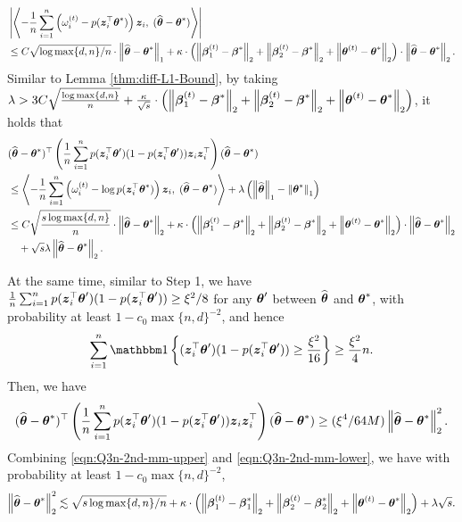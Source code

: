\begin{align*}
&  \abs{\angles{-\frac{1}{n} \sum_{i=1}^{n} \paren{\omega_i^{(t)}- p(\bz_i^\top\btheta^*)}\bz_i, \; (\hat\btheta-\btheta^*) }}  \\
& \le 
C \sqrt{\log \max\{d,n\} / n}\cdot\norm{\hat\btheta-\btheta^*}_1 
+ \kappa\cdot\paren{\norm{\bbeta_1^{(t)} - \bbeta^*}_2 + \norm{\bbeta_2^{(t)} - \bbeta^*}_2 + \norm{\btheta^{(t)} - \btheta^*}_2}\cdot\norm{\hat\btheta-\btheta^*}_2.
\end{align*}
Similar to Lemma \ref{thm:diff-L1-Bound}, by taking $\lambda > 3C\sqrt{\frac{\log \max\{d,n\}}{ n}} + \frac{\kappa}{\sqrt{s}}\cdot\paren{\norm{\bbeta_1^{(t)} - \bbeta^*}_2 + \norm{\bbeta_2^{(t)} - \bbeta^*}_2 + \norm{\btheta^{(t)} - \btheta^*}_2}$, it holds that
\begin{equation}\label{eqn:Q3n-2nd-mm-upper}
	\begin{aligned}
		& (\hat\btheta-\btheta^*)^\top \paren{\frac{1}{n} \sum_{i=1}^{n}p(\bz_i^\top\btheta')(1-p(\bz_i^\top\btheta'))\bz_i\bz_i^\top} (\hat\btheta-\btheta^*)\\
		& \le 
		\angles{-\frac{1}{n} \sum_{i=1}^{n} \paren{\omega_i^{(t)}-\log p(\bz_i^\top\btheta^*)}\bz_i, \; (\hat\btheta-\btheta^*) } + \lambda \paren{\norm{\hat\btheta}_1 - \norm{\btheta^*}_1} \\
		& \le 
		C \sqrt{\frac{s \log \max\{d,n\} }{ n}}\cdot\norm{\hat\btheta-\btheta^*}_2 
		+ \kappa\cdot\paren{\norm{\bbeta_1^{(t)} - \bbeta^*}_2 + \norm{\bbeta_2^{(t)} - \bbeta^*}_2 + \norm{\btheta^{(t)} - \btheta^*}_2}\cdot\norm{\hat\btheta-\btheta^*}_2 \\
		&\quad + \sqrt{s}\lambda \norm{\hat\btheta - \btheta^*}_2.
	\end{aligned}
\end{equation}

At the same time, similar to Step 1, we have $\frac{1}{n}\sum_{i=1}^{n}p(\bz_i^\top\btheta')(1-p(\bz_i^\top\btheta'))\ge\xi^2/8$ for any $\btheta'$ between $\hat\btheta$ and $\btheta^*$, with probability at least $1-c_0\max\{n, d\}^{-2}$, and hence
\[\sum_{i=1}^{n}\bbone\braces{(\bz_i^\top\btheta')(1-p(\bz_i^\top\btheta')) \geq \frac{\xi^2}{16}} \geq \frac{\xi^2}{4}n.\]
Then, we have 
\begin{equation} \label{eqn:Q3n-2nd-mm-lower}
(\hat\btheta-\btheta^*)^\top \paren{\frac{1}{n} \sum_{i=1}^{n}p(\bz_i^\top\btheta')(1-p(\bz_i^\top\btheta'))\bz_i\bz_i^\top} (\hat\btheta-\btheta^*)
\ge (\xi^4/64M) \norm{\hat\btheta-\btheta^*}_2^2.
\end{equation}
Combining \eqref{eqn:Q3n-2nd-mm-upper} and \eqref{eqn:Q3n-2nd-mm-lower}, we have with probability at least $1-c_0\max\{n, d\}^{-2}$, 
\begin{equation}\label{eqn:theta-one-iter}
\norm{\hat\btheta-\btheta^*}_2^2 
\lesssim    
 \sqrt{s \log \max\{d,n\} / n}
+ \kappa\cdot\paren{\norm{\bbeta_1^{(t)} - \bbeta_1^*}_2 + \norm{\bbeta_2^{(t)} - \bbeta_2^*}_2 + \norm{\btheta^{(t)} - \btheta^*}_2}
+ 
\lambda\sqrt{s}.
\end{equation}

